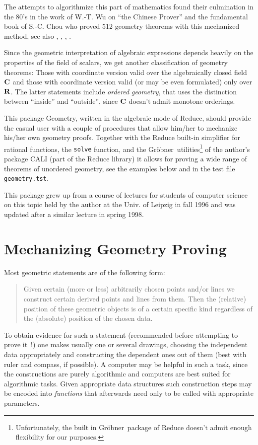 \documentclass{article}
\newcommand{\geo}{{\sc Geometry}}
\newcommand{\gr}{{Gr\"obner}}
\begin{document}
The attempts to algorithmize this part of mathematics found their
culmination in the 80's in the work of W.-T. Wu \cite{Wu:94} on ``the
Chinese Prover'' and the fundamental book \cite{Chou:88} of S.-C. Chou
who proved 512 geometry theorems with this mechanized method, see also
\cite{Chou:84}, \cite{Chou:90}, \cite{Wu:84a}, \cite{Wu:84b}.

Since the geometric interpretation of algebraic expressions depends
heavily on the properties of the field of scalars, we get another
classification of geometry theorems: Those with coordinate version
valid over the algebraically closed field ${\bf C}$ and those with
coordinate version valid (or may be even formulated) only over ${\bf
R}$. The latter statements include {\em ordered geometry}, that uses
the distinction between ``inside'' and ``outside'', since ${\bf C}$
doesn't admit monotone orderings.
\medskip

This package \geo, written in the algebraic mode of Reduce, should
provide the casual user with a couple of procedures that allow him/her
to mechanize his/her own geometry proofs. Together with the Reduce
built-in simplifier for rational functions, the {\tt solve} function,
and the \gr\ utilities\footnote{Unfortunately, the built in \gr\
package of Reduce doesn't admit enough flexibility for our purposes.}
of the author's package CALI \cite{CALI} (part of the Reduce library)
it allows for proving a wide range of theorems of unordered geometry,
see the examples below and in the test file {\tt geometry.tst}.

This package grew up from a course of lectures for students of
computer science on this topic held by the author at the Univ. of
Leipzig in fall 1996 and was updated after a similar lecture in spring
1998.

\section{Mechanizing Geometry Proving}

Most geometric statements are of the following form:
\begin{quote}
Given certain (more or less) arbitrarily chosen points and/or lines we
construct certain derived points and lines from them. Then the
(relative) position of these geometric objects is of a certain
specific kind regardless of the (absolute) position of the chosen
data. 
\end{quote}

To obtain evidence for such a statement (recommended before attempting
to prove it~!) one makes usually one or several drawings, choosing the
independent data appropriately and constructing the dependent ones out
of them (best with ruler and compass, if possible). A computer may be
helpful in such a task, since the constructions are purely algorithmic
and computers are best suited for algorithmic tasks. Given appropriate
data structures such construction steps may be encoded into {\em
functions} that afterwards need only to be called with appropriate
parameters.
\end{document}
